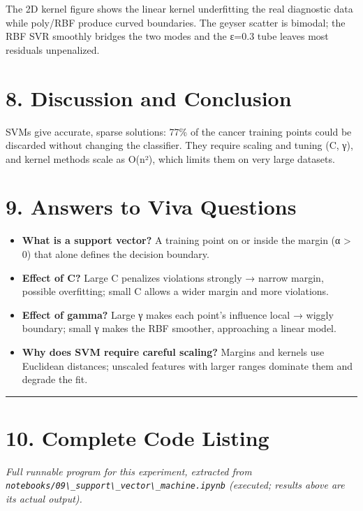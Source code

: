 The 2D kernel figure shows the linear kernel underfitting the real
diagnostic data while poly/RBF produce curved boundaries. The geyser
scatter is bimodal; the RBF SVR smoothly bridges the two modes and the
ε=0.3 tube leaves most residuals unpenalized.

\section{8. Discussion and Conclusion}\label{discussion-and-conclusion}

SVMs give accurate, sparse solutions: 77\% of the cancer training points
could be discarded without changing the classifier. They require scaling
and tuning (C, γ), and kernel methods scale as O(n²), which limits them
on very large datasets.

\section{9. Answers to Viva Questions}\label{answers-to-viva-questions}

\begin{itemize}
\tightlist
\item
  \textbf{What is a support vector?} A training point on or inside the
  margin (α \textgreater{} 0) that alone defines the decision boundary.
\item
  \textbf{Effect of C?} Large C penalizes violations strongly → narrow
  margin, possible overfitting; small C allows a wider margin and more
  violations.
\item
  \textbf{Effect of gamma?} Large γ makes each point's influence local →
  wiggly boundary; small γ makes the RBF smoother, approaching a linear
  model.
\item
  \textbf{Why does SVM require careful scaling?} Margins and kernels use
  Euclidean distances; unscaled features with larger ranges dominate
  them and degrade the fit.
\end{itemize}

\begin{center}\rule{0.5\linewidth}{0.5pt}\end{center}

\section{10. Complete Code Listing}\label{complete-code-listing}

\emph{Full runnable program for this experiment, extracted from
\passthrough{\lstinline!notebooks/09\_support\_vector\_machine.ipynb!}
(executed; results above are its actual output).}

